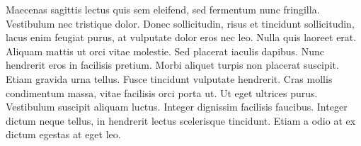 Maecenas sagittis lectus quis sem eleifend, sed fermentum nunc fringilla. Vestibulum nec tristique dolor. Donec sollicitudin, risus et tincidunt sollicitudin, lacus enim feugiat purus, at vulputate dolor eros nec leo. Nulla quis laoreet erat. Aliquam mattis ut orci vitae molestie. Sed placerat iaculis dapibus. Nunc hendrerit eros in facilisis pretium. Morbi aliquet turpis non placerat suscipit. Etiam gravida urna tellus. Fusce tincidunt vulputate hendrerit. Cras mollis condimentum massa, vitae facilisis orci porta ut. Ut eget ultrices purus. Vestibulum suscipit aliquam luctus. Integer dignissim facilisis faucibus. Integer dictum neque tellus, in hendrerit lectus scelerisque tincidunt. Etiam a odio at ex dictum egestas at eget leo.
